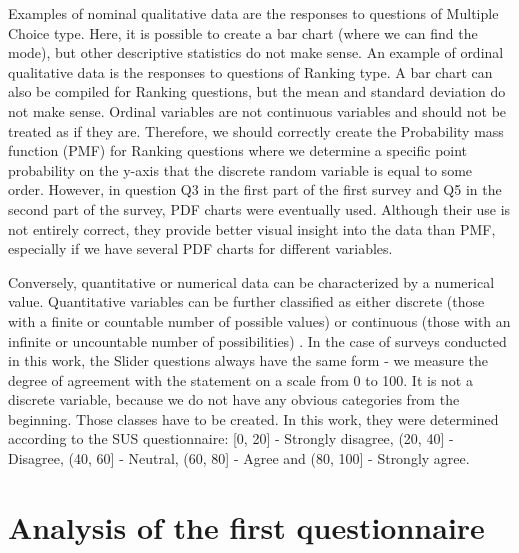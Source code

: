 \documentclass[a4paper,10pt,twoside]{article}
\begin{document}
Examples of nominal qualitative data are the responses to questions of
Multiple Choice type. Here, it is possible to create a bar chart
(where we can find the mode), but other descriptive statistics do not
make sense. An example of ordinal qualitative data is the responses to
questions of Ranking type. A bar chart can also be compiled for
Ranking questions, but the mean and standard deviation do not make
sense. Ordinal variables are not continuous variables and should not
be treated as if they are. Therefore, we should correctly create the
Probability mass function (PMF) for Ranking questions where we
determine a specific point probability on the y-axis that the discrete
random variable is equal to some order. However, in question Q3 in the
first part of the first survey and Q5 in the second part of the
survey, PDF charts were eventually used. Although their use is not
entirely correct, they provide better visual insight into the data
than PMF, especially if we have several PDF charts for different
variables.

Conversely, quantitative or numerical data can be characterized by a
numerical value. Quantitative variables can be further classified as
either discrete (those with a finite or countable number of possible
values) or continuous (those with an infinite or uncountable number of
possibilities) \cite{wisconsin1}. In the case of surveys conducted in
this work, the Slider questions always have the same form - we measure
the degree of agreement with the statement on a scale from 0 to
100. It is not a discrete variable, because we do not have any obvious
categories from the beginning. Those classes have to be created. In
this work, they were determined according to the SUS questionnaire:
[0, 20] - Strongly disagree, (20, 40] - Disagree, (40, 60] - Neutral,
(60, 80] - Agree and (80, 100] - Strongly agree.




\newpage
\vspace*{-1cm}
\section{Analysis of the first questionnaire}
\label{sec:qstat}
\end{document}
